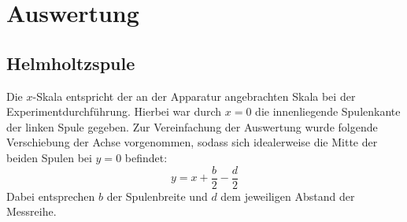 \section{Auswertung}
\label{sec:Auswertung}
\subsection{Helmholtzspule}
Die $x$-Skala entspricht der an der Apparatur angebrachten Skala bei der Experimentdurchführung. 
Hierbei war durch $x=0$ die innenliegende Spulenkante der linken Spule gegeben. 
Zur Vereinfachung der Auswertung wurde folgende Verschiebung der Achse vorgenommen, sodass sich idealerweise die Mitte der 
beiden Spulen bei $y=0$ befindet:
\begin{equation*}
    y=x+\frac{b}{2} -\frac{d}{2}
\end{equation*}
Dabei entsprechen $b$ der Spulenbreite und $d$ dem jeweiligen Abstand der Messreihe.

